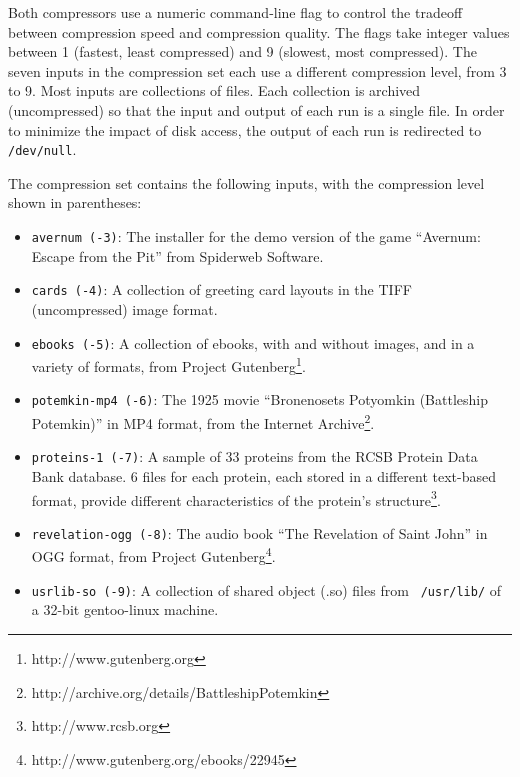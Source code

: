 Both compressors use a numeric command-line flag to control the
tradeoff between compression speed and compression quality.  The flags
take integer values between 1 (fastest, least compressed) and 9
(slowest, most compressed).  The seven inputs in the compression set
each use a different compression level, from 3 to 9.  Most inputs are
collections of files.  Each collection is archived (uncompressed) so
that the input and output of each run is a single file.  In order to
minimize the impact of disk access, the output of each run is
redirected to {\tt /dev/null}.

The compression set contains the following inputs, with the
compression level shown in parentheses:
\begin{itemize}

\item {\tt avernum (-3)}: The installer for the demo version of the game
  ``Avernum: Escape from the Pit'' from Spiderweb Software.

\item {\tt cards (-4)}: A collection of greeting card layouts in the TIFF 
  (uncompressed) image format.

\item {\tt ebooks (-5)}: A collection of ebooks, with and without images,
  and in a variety of formats, from Project
  Gutenberg\footnote{http://www.gutenberg.org}.

\item {\tt potemkin-mp4 (-6)}: The 1925 movie ``Bronenosets Potyomkin
  (Battleship Potemkin)'' in MP4 format, from the Internet
  Archive\footnote{http://archive.org/details/BattleshipPotemkin}.

\item {\tt proteins-1 (-7)}: A sample of 33 proteins from the RCSB Protein Data
  Bank database.  6 files for each protein, each stored in a different
  text-based format, provide different characteristics of the protein's
  structure\footnote{http://www.rcsb.org}.

\item {\tt revelation-ogg (-8)}: The audio book ``The Revelation of Saint
  John'' in OGG format, from Project
  Gutenberg\footnote{http://www.gutenberg.org/ebooks/22945}.

\item {\tt usrlib-so (-9)}: A collection of shared object (.so) files from {\tt
  /usr/lib/} of a 32-bit gentoo-linux machine.

\end{itemize}

